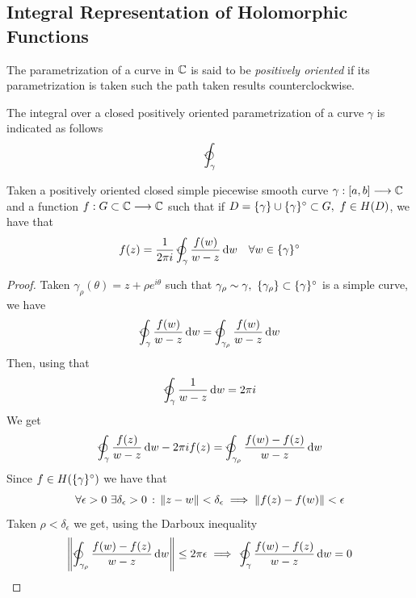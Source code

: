 \documentclass[../complete.tex]{subfiles}
\begin{document}
\subsection{Integral Representation of Holomorphic Functions}
\begin{dfn}
	The parametrization of a curve in $\mathbb{C}$ is said to be \textit{positively oriented} if its parametrization is taken such the path taken results counterclockwise.
\end{dfn}
\begin{ntn}
	The integral over a closed positively oriented parametrization of a curve $\gamma$ is indicated as follows
	\begin{equation*}
		\ointccw_\gamma
	\end{equation*}
\end{ntn}
\begin{thm}
	Taken a positively oriented closed simple piecewise smooth curve $\gamma:[a,b]\overset{}{\longrightarrow}\mathbb{C}$ and a function $f:G\subset\mathbb{C}\overset{}{\longrightarrow}\mathbb{C}$ such that if $D=\{\gamma\}\cup\intr{\{\gamma\}}\subset G,\ f\in H(D)$, we have that
	\begin{equation}
		f(z)=\frac{1}{2\pi i}\ointccw_\gamma\frac{f(w)}{w-z}\diff w\quad\forall w\in\intr{\{\gamma\}}
		\label{eq:cauchyintegral}
	\end{equation}
\end{thm}
\begin{proof}
	Taken $\gamma_\rho(\theta)=z+\rho e^{i\theta}$ such that $\gamma_\rho\sim\gamma,\ \{\gamma_\rho\}\subset\intr{\{\gamma\}}$ is a simple curve, we have
	\begin{equation*}
		\ointccw_{\gamma}\frac{f(w)}{w-z}\diff w=\ointccw_{\gamma_\rho}\frac{f(w)}{w-z}\diff w
	\end{equation*}
	Then, using that
	\begin{equation*}
		\ointccw_{\gamma}\frac{1}{w-z}\diff w=2\pi i
	\end{equation*}
	We get
	\begin{equation*}
		\ointccw_{\gamma}\frac{f(z)}{w-z}\diff w-2\pi if(z)=\ointccw_{\gamma_\rho}\frac{f(w)-f(z)}{w-z}\diff w
	\end{equation*}
	Since $f\in H(\{\gamma\}^{\circ})$ we have that
	\begin{equation*}
		\forall\epsilon>0\ \exists\delta_\epsilon>0\st\norm{z-w}<\delta_\epsilon\implies{}\norm{f(z)-f(w)}<\epsilon
	\end{equation*}
	Taken $\rho<\delta_\epsilon$ we get, using the Darboux inequality
	\begin{equation*}
		\norm{\ointccw_{\gamma_\rho}\frac{f(w)-f(z)}{w-z}\diff w}\le 2\pi\epsilon\implies{}\ointccw_{\gamma}\frac{f(w)-f(z)}{w-z}\diff w=0
	\end{equation*}
\end{proof}
\end{document}
